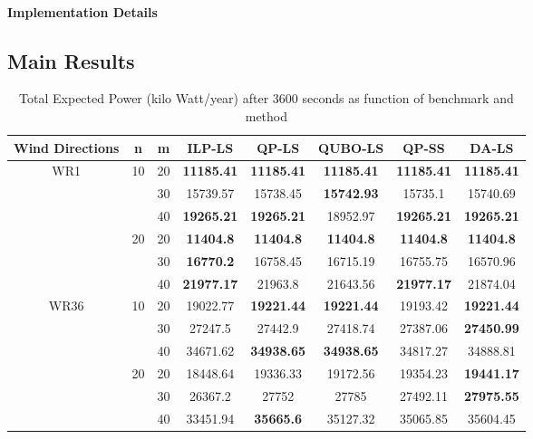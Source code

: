 \documentclass[preprint,12pt]{elsarticle}
\begin{document}
\paragraph{Implementation Details}


\subsection{Main Results}

\begin{table}[ht]

	\begin{tabular}{| c | c | c | c | c | c | c | c |}
		\toprule
		Wind Directions  & n        & m        & ILP-LS       & QP-LS       & QUBO-LS       & QP-SS       & DA-LS     \\
		\toprule
		\multirow{6}{*}{WR1}  & \multirow{3}{*}{10}       & 20       & \textbf{11185.41} & \textbf{11185.41} & \textbf{11185.41} & \textbf{11185.41} & \textbf{11185.41} \\
			& & 30   & 15739.57 & 15738.45 & \textbf{15742.93} & 15735.1  & 15740.69         \\
		& & 40 & \textbf{19265.21} & \textbf{19265.21} & 18952.97 & \textbf{19265.21} & \textbf{19265.21}                \\
				\cline{2-8}
		&\multirow{3}{*}{20}   & 20       & \textbf{11404.8}  & \textbf{11404.8}  & \textbf{11404.8}  & \textbf{11404.8}  & \textbf{11404.8}           \\
		&&30   & \textbf{16770.2} & 16758.45 & 16715.19 & 16755.75 & 16570.96                   \\
		&&40   & \textbf{21977.17} & 21963.8 & 21643.56 & \textbf{21977.17} & 21874.04                     \\
		\hline
		\multirow{6}{*}{WR36} &  \multirow{3}{*}{10}    & 20       & 19022.77 & \textbf{19221.44} & \textbf{19221.44} & 19193.42 & \textbf{19221.44} \\
		&& 30   & 27247.5  & 27442.9  & 27418.74 & 27387.06 & \textbf{27450.99}                  \\
		&&40   & 34671.62 & \textbf{34938.65} & \textbf{34938.65} & 34817.27 & 34888.81                  \\
		\cline{2-8}
		&  \multirow{3}{*}{20}   & 20       & 18448.64 & 19336.33 & 19172.56 & 19354.23 & \textbf{19441.17}          \\
		&&30   & 26367.2  & 27752 & 27785 & 27492.11 & \textbf{27975.55}                     \\
		&&40   & 33451.94 & \textbf{35665.6}  & 35127.32 & 35065.85 & 35604.45  \\
		\bottomrule                   
	\end{tabular}

\vspace{0.5em}
\caption{Total Expected Power (kilo Watt/year) after 3600 seconds as function of benchmark and method}\label{tab:results1}
\end{table}
\end{document}
